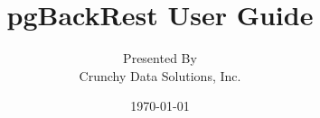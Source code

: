 \documentclass[titlepage,letterpaper,12pt]{article}
\begin{document}
\title{pgBackRest User Guide}
\author{Presented By\\
        Crunchy Data Solutions, Inc.}
\date{\today}
\maketitle

\renewcommand\contentsname{Table of Contents}
\tableofcontents
\newpage

%
%
%
%
%
%
%
%
%

\end{document}
